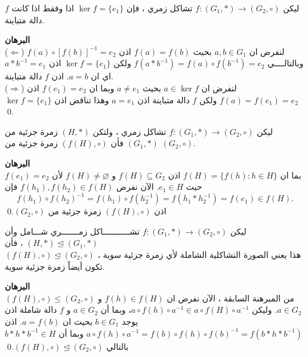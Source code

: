 	\begin{theorem}
					ليكن 	$f : (G_1, *) \to (G_2, \circ)$ تشاكل زمري ، فإن $\ker f=\{e_1\}$ اذا وفقط اذا كانت $f$ دالة متباينة.
	\end{theorem}
	\noindent
	\textbf{البرهان}\\
	\noindent
	($\Leftarrow$) لنفرض ان $a, b\in G_1$ بحيث $f(a) = f(b)$ اذن $f(a) \circ [f(b)]^{-1} = e_2$ وبالتالــــي $f(a * b^{-1}) = f(a) \circ f(b^{-1}) = e_2$ ولكن $\ker f = \{e_1\}$ اذن $a*b^{-1} = e_1$ اي ان $a = b$. اذن $f$ دالة متباينة.\\
	($\Rightarrow$) لنفرض ان $a \in \ker f$ بحيث $a\neq e_1$ وبما ان $f(e_1) = e_2$ اذن $f(a) = f(e_1) = e_2$ ولكن $f$ دالة متباينة اذن $a = e_1$ وهذا تناقض اذن $\ker f = \{e_1\}$.\qed
	\newpage
	\begin{theorem}
	ليكن 	$f : (G_1, *) \to (G_2, \circ)$ تشاكل زمري ، ولتكن $(H, *)$ زمرة جزئية من 
	$(G_1, *)$ فأن $(f(H), \circ )$ زمرة جزئية من $(G_2, \circ)$.
	\end{theorem}
	\noindent
	\textbf{البرهان}\\
	\noindent
	بما ان
	$f(H) = \{ f(h) : h\in H\}$ اذن $f(H) \subseteq G_2$ و $f(H) \neq \varnothing$ لأن $f(e_1) = e_2$ حيث $e_1 \in H$. الآن نفرض $f(h_1) , f(h_2) \in f(H)$ فإن 
	\[
	f(h_1) \circ f(h_2)^{-1} = f(h_1) \circ f(h_2^{-1}) = f(h_1 * h_2^{-1} )  = f(e_1)\in f(H). 
 	\]
 	اذن $(f(H), \circ )$ زمرة جزئية من $(G_2, \circ)$.\qed
 	
 	\begin{theorem}
 ليكن $f : (G_1, *) \to (G_2, \circ)$ تشـــــــــــاكل زمـــــــري شـــامل وأن 
 $(H, *) \trianglelefteq (G_1, *)$ ، فأن\\
 $(f(H), \circ) \trianglelefteq (G_2, \circ)$
 ، هذا يعني الصورة التشاكلية الشاملة لأي زمرة جزئية سوية تكون أيضاً زمرة جزئية سوية.
 	\end{theorem}
\noindent
\textbf{البرهان}\\
\noindent
 $(f(H), \circ) \leq (G_2, \circ)$ من المبرهنة السابقة ، الآن نفرض ان $f(h) \in f(H)$ و $a\in G_2$. وليكن $a\circ f(h) \circ a^{-1} \in a \circ f(H) \circ a^{-1}$، وبما أن $a\in G_2$ و $f$ دالة شاملة اذن يوجد $b\in G_1$ بحيث ان $a = f(b)$.  اذن
 $
 a\circ f(h) \circ a^{-1}= f(b) \circ f(h) \circ f(b)^{-1} = f(b*h*b^{-1})
 $
 وبما أن
 $b * h * b^{-1} \in H$ بالتالي $(f(H), \circ) \trianglelefteq (G_2, \circ)$.\qed
 
